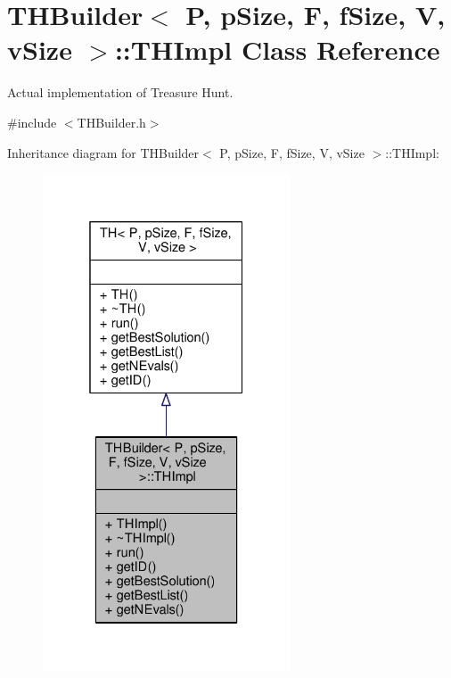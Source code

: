 \hypertarget{classTHBuilder_1_1THImpl}{}\section{T\+H\+Builder$<$ P, p\+Size, F, f\+Size, V, v\+Size $>$\+:\+:T\+H\+Impl Class Reference}
\label{classTHBuilder_1_1THImpl}


Actual implementation of Treasure Hunt.  




{\ttfamily \#include $<$T\+H\+Builder.\+h$>$}



Inheritance diagram for T\+H\+Builder$<$ P, p\+Size, F, f\+Size, V, v\+Size $>$\+:\+:T\+H\+Impl\+:\nopagebreak
\begin{figure}[H]
\begin{center}
\leavevmode
\includegraphics[width=208pt]{classTHBuilder_1_1THImpl__inherit__graph}
\end{center}
\end{figure}


